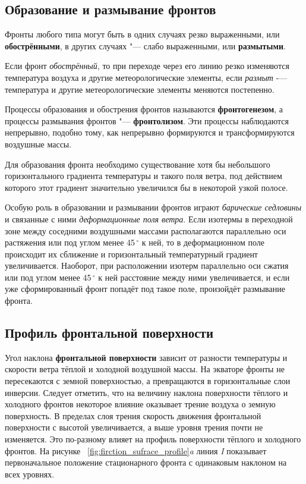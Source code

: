\documentclass[a4paper, 12pt, twoside, final, book, russian, fittopage, cyremdash, openright]{ncc}
\newcommand{\gr}{\ensuremath{\,^\circ}\xspace}
\begin{document}
\subsection{Образование и размывание фронтов}
\label{sec:makes_fronts}

Фронты любого типа могут быть в одних случаях резко выраженными, или
\textbf{обострёнными}, в других случаях "--- слабо
выраженными, или \textbf{размытыми}.

Если фронт \textit{обострённый}, то при переходе через его линию резко
изменяются температура воздуха и другие метеорологические элементы,
если \textit{размыт} \--— температура и другие метеорологические
элементы меняются постепенно.

Процессы образования и обострения фронтов называются
\textbf{фронтогенезом}, а процессы размывания
фронтов "--- \textbf{фронтолизом}. Эти процессы
наблюдаются непрерывно, подобно тому, как непрерывно формируются и
трансформируются воздушные массы.

Для образования фронта необходимо существование хотя бы небольшого
горизонтального градиента температуры и такого поля ветра, под
действием которого этот градиент значительно увеличился бы в некоторой
узкой полосе.

Особую роль в образовании и размывании фронтов играют \textit{барические
седловины} и связанные с ними \textit{деформационные поля ветра}. Если изотермы
в переходной зоне между соседними воздушными массами располагаются
параллельно оси растяжения или под углом менее 45\gr к ней, то в
деформационном поле происходит их сближение и горизонтальный
температурный градиент увеличивается. Наоборот, при расположении
изотерм параллельно оси сжатия или под углом менее 45\gr к ней
расстояние между ними увеличивается, и если уже сформированный фронт
попадёт под такое поле, произойдёт размывание фронта.

\subsection{Профиль фронтальной поверхности}
\label{sec:frontal_surface_profile}

Угол наклона \textbf{фронтальной поверхности} зависит от разности
температуры и скорости ветра тёплой и холодной воздушной массы. На
экваторе фронты не пересекаются с земной поверхностью, а превращаются
в горизонтальные слои инверсии. Следует отметить, что на величину
наклона поверхности тёплого и холодного фронтов некоторое влияние
оказывает трение воздуха о земную поверхность. В пределах слоя трения
скорость движения фронтальной поверхности с высотой увеличивается, а
выше уровня трения почти не изменяется. Это по-разному влияет на
профиль поверхности тёплого и холодного фронтов. На рисунке
~\ref{fig:firction_sufrace_profile}\textit{a} линия \textit{I}
показывает первоначальное положение стационарного фронта с одинаковым
наклоном на всех уровнях.
\end{document}
